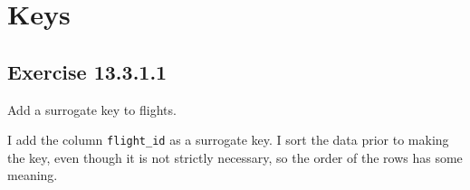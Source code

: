 \documentclass[]{book}
\theoremstyle{plain}
\theoremstyle{remark}
\begin{document}
\hypertarget{keys}{%
\section{Keys}\label{keys}}

\hypertarget{exercise-13.3.1.1}{%
\subsection*{\texorpdfstring{Exercise
{13.3.1.1}}{Exercise 13.3.1.1}}\label{exercise-13.3.1.1}}

Add a surrogate key to flights.

I add the column \texttt{flight\_id} as a surrogate key. I sort the data
prior to making the key, even though it is not strictly necessary, so
the order of the rows has some meaning.
\end{document}
